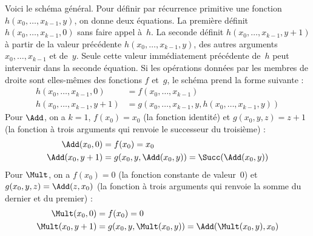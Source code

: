 \documentclass[../../../include/open-logic-section]{subfiles}
\begin{document}
Voici le schéma général. Pour définir par récurrence primitive une
fonction $h(x_0,\dots,x_{k-1},y)$, on donne deux équations. La
première définit $h(x_0,\dots,x_{k-1},0)$ sans faire appel à~$h$.
La seconde définit $h(x_0,\dots,x_{k-1},y+1)$ à partir de la
valeur précédente $h(x_0,\dots,x_{k-1},y)$, des autres arguments
$x_0,\dots,x_{k-1}$ et de~$y$. Seule cette valeur immédiatement
précédente de~$h$ peut intervenir dans la seconde équation. Si les
opérations données par les membres de droite sont elles-mêmes des
fonctions $f$ et~$g$, le schéma prend la forme suivante :
\begin{align*}
  h(x_0, \dots, x_{k-1}, 0) & = f(x_0, \dots, x_{k-1})\\
  h(x_0, \dots, x_{k-1}, y+1) & =
  g(x_0, \dots, x_{k-1}, y, h(x_0, \dots, x_{k-1}, y))
\end{align*}
Pour $\Add$, on a $k=1$, $f(x_0)=x_0$ (la fonction identité) et
$g(x_0,y,z)=z+1$ (la fonction à trois arguments qui renvoie le
successeur du troisième) :
\begin{align*}
  \Add(x_0, 0) & = f(x_0) = x_0\\
  \Add(x_0, y+1) & = g(x_0, y, \Add(x_0, y)) =
  \Succ(\Add(x_0, y))
\end{align*}
Pour $\Mult$, on a $f(x_0)=0$ (la fonction constante de valeur~$0$)
et $g(x_0,y,z)=\Add(z,x_0)$ (la fonction à trois arguments qui
renvoie la somme du dernier et du premier) :
\begin{align*}
  \Mult(x_0,0) & =  f(x_0) = 0 \\
  \Mult(x_0,y+1) & =  g(x_0, y, \Mult(x_0,y)) =
  \Add(\Mult(x_0,y), x_0)
\end{align*}
\end{document}
